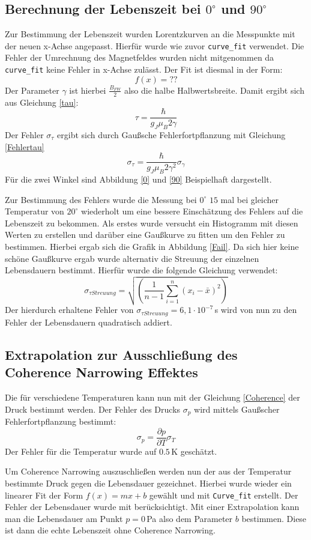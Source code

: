 \subsection{Berechnung der Lebenszeit bei $0^\circ$ und $90^\circ$}
Zur Bestimmung der Lebenszeit wurden Lorentzkurven an die Messpunkte mit der neuen x-Achse angepasst. Hierfür wurde wie zuvor \verb|curve_fit| verwendet. Die Fehler der Umrechnung des Magnetfeldes wurden nicht mitgenommen da \verb|curve_fit| keine Fehler in x-Achse zulässt. Der Fit ist diesmal in der Form:
\begin{equation}
	f(x)=??
	\label{Lorenzfit}
\end{equation}
Der Parameter $\gamma$ ist hierbei $\frac{B_{FW}}{2}$ also die halbe Halbwertsbreite. Damit ergibt sich aus Gleichung \ref{tau}:
\begin{equation}
	\tau=\frac{\hbar}{g_J\mu_B2\gamma}
\end{equation} 
Der Fehler $\sigma_\tau$ ergibt sich durch Gaußsche Fehlerfortpflanzung mit Gleichung \ref{Fehlertau}
\begin{equation}
	\sigma_\tau=\frac{\hbar}{g_J\mu_B2\gamma^2}\sigma_\gamma
	\label{Fehlertau}
\end{equation}
Für die zwei Winkel sind Abbildung \ref{0} und \ref{90} Beispielhaft dargestellt.\par
Zur Bestimmung des Fehlers wurde die Messung bei $0^\circ$ $15$ mal bei gleicher Temperatur von $20^\circ$ wiederholt um eine bessere Einschätzung des Fehlers auf die Lebenszeit zu bekommen. Als erstes wurde versucht ein Histogramm mit diesen Werten zu erstellen und darüber eine Gaußkurve zu fitten um den Fehler zu bestimmen. Hierbei ergab sich die Grafik in Abbildung \ref{Fail}. Da sich hier keine schöne Gaußkurve ergab wurde alternativ die Streuung der einzelnen Lebensdauern bestimmt. Hierfür wurde die folgende Gleichung verwendet:
\begin{equation}
	\sigma_{\tau Streuung}=\sqrt{\left(\frac{1}{n-1}\sum_{i=1}^{n}(x_i-\bar{x})^2\right)}
\end{equation}
Der hierdurch erhaltene Fehler  von $\sigma_{\tau Streuung}=6,1\cdot10^{-7}\,$s wird von nun zu den Fehler der Lebensdauern quadratisch addiert.
\subsection{Extrapolation zur Ausschließung des Coherence Narrowing Effektes}
Die für verschiedene Temperaturen kann nun mit der Gleichung \ref{Coherence} der Druck bestimmt werden. Der Fehler des Drucks $\sigma_p$ wird mittels Gaußscher Fehlerfortpflanzung bestimmt:
\begin{equation}
\sigma_p = \frac{\partial p}{\partial T} \sigma_T
\end{equation}
Der Fehler für die Temperatur wurde auf $0.5\,$K geschätzt.\par
Um Coherence Narrowing auszuschließen werden nun der aus der Temperatur bestimmte Druck gegen die Lebensdauer gezeichnet. Hierbei wurde wieder ein linearer Fit der Form $f(x)=mx+b$ gewählt und mit \verb|Curve_fit| erstellt. Der Fehler der Lebensdauer wurde mit berücksichtigt. Mit einer Extrapolation kann man die Lebensdauer am Punkt $p=0\,$Pa also dem Parameter $b$ bestimmen. Diese ist dann die echte Lebenszeit ohne Coherence Narrowing. 
